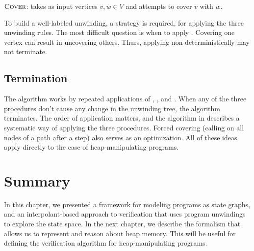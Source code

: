 \begin{algorithm}[ht]


  \caption{$\textsc{Cover}$: takes as input vertices $v, w \in V$ and attempts to cover $v$ with $w$.}
  \label{alg:cover}
\end{algorithm}

To build a well-labeled unwinding, a strategy is required, for applying the three unwinding rules. The most difficult question is when to apply \cover. Covering one vertex can result in uncovering others. Thurs, applying \cover non-deterministically may not terminate.

\subsection{Termination}
The \impact algorithm works by repeated applications of \expand, \cover, and . When any of the three procedures don't cause any change in the unwinding tree, the algorithm terminates. The order of application matters, and the \unwind algorithm in \cite{mcmillan06} describes a systematic way of applying the three procedures. Forced covering (calling \cover on all nodes of a path after a  step) also serves as an optimization. All of these ideas apply directly to the case of heap-manipulating programs.

\section*{Summary}
In this chapter, we presented a framework for modeling programs as state graphs, and an interpolant-based approach to verification that uses program unwindings to explore the state space. In the next chapter, we describe the formalism that allows us to represent and reason about heap memory. This will be useful for defining the verification algorithm for heap-manipulating programs.
